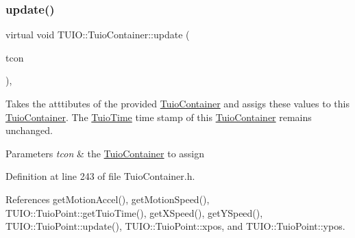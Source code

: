 \subsubsection{\texorpdfstring{update()}{update()}\hspace{0.1cm}{\footnotesize\ttfamily [4/4]}}
{\footnotesize\ttfamily virtual void T\+U\+I\+O\+::\+Tuio\+Container\+::update (\begin{DoxyParamCaption}\item[{\hyperlink{class_t_u_i_o_1_1_tuio_container}{Tuio\+Container} $\ast$}]{tcon }\end{DoxyParamCaption})\hspace{0.3cm}{\ttfamily [inline]}, {\ttfamily [virtual]}}

Takes the atttibutes of the provided \hyperlink{class_t_u_i_o_1_1_tuio_container}{Tuio\+Container} and assigs these values to this \hyperlink{class_t_u_i_o_1_1_tuio_container}{Tuio\+Container}. The \hyperlink{class_t_u_i_o_1_1_tuio_time}{Tuio\+Time} time stamp of this \hyperlink{class_t_u_i_o_1_1_tuio_container}{Tuio\+Container} remains unchanged.


\begin{DoxyParams}{Parameters}
{\em tcon} & the \hyperlink{class_t_u_i_o_1_1_tuio_container}{Tuio\+Container} to assign \\
\hline
\end{DoxyParams}


Definition at line 243 of file Tuio\+Container.\+h.



References get\+Motion\+Accel(), get\+Motion\+Speed(), T\+U\+I\+O\+::\+Tuio\+Point\+::get\+Tuio\+Time(), get\+X\+Speed(), get\+Y\+Speed(), T\+U\+I\+O\+::\+Tuio\+Point\+::update(), T\+U\+I\+O\+::\+Tuio\+Point\+::xpos, and T\+U\+I\+O\+::\+Tuio\+Point\+::ypos.


